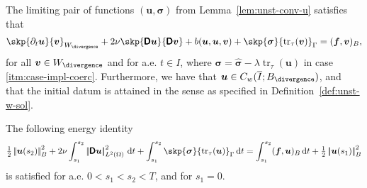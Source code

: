 \documentclass[reqno,a4paper]{amsart}
\def\norm#1{\left|\!\left| #1 \right|\!\right|}
\def\tens#1{\pmb{\mathsf{#1}}}
\def\vec#1{\boldsymbol{#1}}
\def\tr{\mathop{\mathrm{tr}}\nolimits}
\def\d{{\rm d}}
\def\dt{\,\d t}
\def\Wdiv{{W_{\divergence}}}
\def\bf{\vec{f}}
\def\bu{\vec{u}}
\def\bv{\vec{v}}
\def\bsigma{\vec{\sigma}}
\def\BD{\tens{D}}
\begin{document}
	
	\begin{proposition}\label{prop:limit-eq}
		The limiting pair of functions $(\bu, \bsigma)$ from Lemma~\ref{lem:unst-conv-u} satisfies that 
		\begin{align}
			\skp{\partial_t  \bu}{ \bv}_{\Wdiv} 
			+ 2 \nu \skp{\BD \bu}{ \BD \bv}   
			+  b(\bu,\bu,\bv)  
			+  \skp{
				\bsigma
			}{\tr_\tau(\bv)}_{\Gamma}  =  ( \bf, {\bv})_B,
		\end{align}
		for all $\bv \in \Wdiv$ and for a.e. $t \in I$, where 
		$\bsigma = \widehat{\bsigma} - \lambda \tr_{\tau}(\bu)$ in case \ref{itm:case-impl-coerc}. 
		Furthermore, we have that $\bu \in C_w(\overline I;B_{\divergence})$, and that the initial datum is attained in the sense as specified in Definition~\ref{def:unst-w-sol}. 
		
		The following energy identity 
		\begin{align*}
			\tfrac{1}{2} \norm{\bu(s_2)}_{B}^2  + 2 \nu \int_{s_1}^{s_2}  \norm{\BD \bu}_{L^2(\Omega)}^2 \dt   + \int_{s_1}^{s_2} \skp{\bsigma}{\tr_{\tau} (\bu)}_{\Gamma} \dt 
			= \int_{s_1}^{s_2} (\bf,\bu)_B \dt + 	\tfrac{1}{2} \norm{\bu(s_1)}_{B}^2  
		\end{align*}
		is satisfied for a.e. $0<s_1<s_2< T$, and for $s_1 = 0$.  
	\end{proposition}
\end{document}

